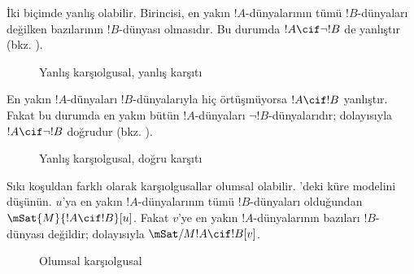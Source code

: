 \documentclass[../../../include/open-logic-section]{subfiles}
\begin{document}
İki biçimde yanlış olabilir. Birincisi, en yakın $!A$-dünyalarının tümü
$!B$-dünyaları değilken bazılarının $!B$-dünyası olmasıdır. Bu durumda
$!A\cif\lnot !B$ de yanlıştır (bkz. ).
\begin{figure}
\begin{center}
\caption{Yanlış karşıolgusal, yanlış karşıtı}
\end{center}
\end{figure}
En yakın $!A$-dünyaları $!B$-dünyalarıyla hiç örtüşmüyorsa
$!A\cif !B$ yanlıştır. Fakat bu durumda en yakın bütün $!A$-dünyaları
$\lnot !B$-dünyalarıdır; dolayısıyla $!A\cif\lnot !B$ doğrudur
(bkz. ).
\begin{figure}
\begin{center}
\caption{Yanlış karşıolgusal, doğru karşıtı}
\end{center}
\end{figure}

Sıkı koşuldan farklı olarak karşıolgusallar olumsal olabilir.
'deki küre modelini düşünün. $u$'ya en yakın
$!A$-dünyalarının tümü $!B$-dünyaları olduğundan
$\mSat{M}{!A\cif !B}[u]$. Fakat $v$'ye en yakın $!A$-dünyalarının bazıları
$!B$-dünyası değildir; dolayısıyla $\mSat/{M}{!A\cif !B}[v]$.
\begin{figure}
\begin{center}
\end{center}
\caption{Olumsal karşıolgusal}
\end{figure}
\end{document}
